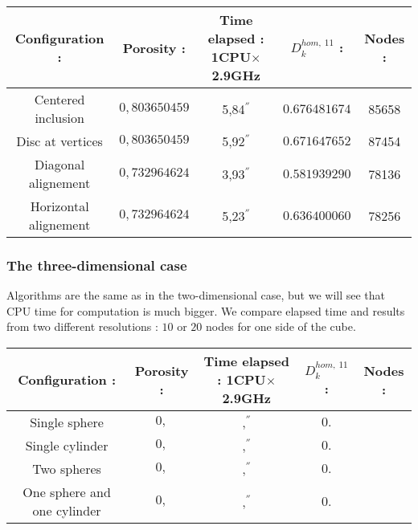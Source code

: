 \begin{center}
\begin{tabular}{|c|c|c|c|c|}
\hline
\rowcolor{gray} Configuration :&Porosity :&Time elapsed : 1CPU$\times$2.9GHz&$D_k^{hom, \ 11}$ :&Nodes :\\
\hline
Centered inclusion&$0,803650459$&5,84${}^{''}$&$0.676481674$&85658 \\
\hline
Disc at vertices&$0,803650459$&5,92${}^{''}$&$0.671647652$&87454 \\
\hline
Diagonal alignement&$0,732964624$&3,93${}^{''}$&$0.581939290$&78136 \\
\hline
Horizontal alignement&$0,732964624$&5,23${}^{''}$&$0.636400060$&78256 \\
\hline
\end{tabular}
\end{center}

\subsubsection{The three-dimensional case}

Algorithms are the same as in the two-dimensional case, but we will see that CPU time for computation is much bigger. %
We compare elapsed time and results from two different resolutions : $10$ or $20$ nodes for one side of the cube.

\begin{comment}
\begin{figure}[H]
%
\begin{center}
%
\end{center}
%
\end{figure}
\end{comment}



\begin{center}
\begin{tabular}{|c|c|c|c|c|}
\hline
\rowcolor{gray} Configuration :&Porosity :&Time elapsed : 1CPU$\times$2.9GHz&$D_k^{hom, \ 11}$ :&Nodes :\\
\hline
Single sphere&$0,$&,${}^{''}$&$0.$& \\
\hline
Single cylinder&$0,$&,${}^{''}$&$0.$& \\
\hline
Two spheres&$0,$&,${}^{''}$&$0.$& \\
\hline
One sphere and one cylinder&$0,$&,${}^{''}$&$0.$& \\
\hline
\end{tabular}
\end{center}



